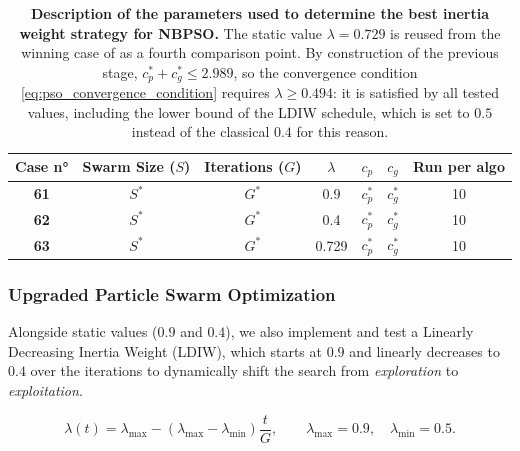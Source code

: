 \documentclass[12pt, openany]{article}
\begin{document}
\begin{table}[H]
    \centering
    \renewcommand{\arraystretch}{1.5}
    \begin{tabular}{|c|c|c|c|c|c|c|}
        \hline 
        \textbf{Case n°} & \textbf{Swarm Size ($S$)} & \textbf{Iterations ($G$)} & $\lambda$ & $c_p$ & $c_g$ & \textbf{Run per algo} \\ \hline

        \textbf{61} & $S^*$ & $G^*$ & 0.9 & $c_p^*$ & $c_g^*$ & 10 \\ \hdashline
        \textbf{62} & $S^*$ & $G^*$ & 0.4 & $c_p^*$ & $c_g^*$ & 10 \\ \hdashline
        \textbf{63} & $S^*$ & $G^*$ & 0.729 & $c_p^*$ & $c_g^*$ & 10 \\ 
        \hline
    \end{tabular}
    \caption{\textbf{Description of the parameters used to determine the best inertia weight strategy for NBPSO.} The static value $\lambda = 0.729$ is reused from the winning case of  as a fourth comparison point. By construction of the previous stage, $c_p^* + c_g^* \leq 2.989$, so the convergence condition \eqref{eq:pso_convergence_condition} requires $\lambda \geq 0.494$: it is satisfied by all tested values, including the lower bound of the LDIW schedule, which is set to $0.5$ instead of the classical $0.4$ for this reason.}
    \label{tab:Cases_Determine_NBPSO_Inertia}
\end{table}

\subsubsection{Upgraded Particle Swarm Optimization}

Alongside static values ($0.9$ and $0.4$), we also implement and test a Linearly Decreasing Inertia Weight (LDIW), which starts at $0.9$ and linearly decreases to $0.4$ over the iterations to dynamically shift the search from \emph{exploration} to \emph{exploitation}.

\begin{equation}\label{eq:ldiw}
    \lambda(t) = \lambda_{\max} - \left(\lambda_{\max} - \lambda_{\min}\right)\frac{t}{G}, 
    \qquad \lambda_{\max} = 0.9, \quad \lambda_{\min} = 0.5.
\end{equation}
\end{document}

